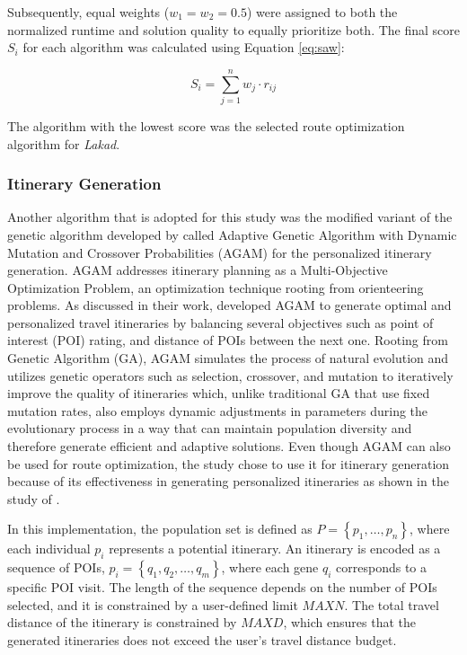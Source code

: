 Subsequently, equal weights ($w _{1} = w _{2} = 0.5$) were assigned to both the normalized runtime and solution quality to equally prioritize both. The final score \( S_{i} \) for each algorithm was calculated using Equation \ref{eq:saw}:

\begin{equation}
	\label{eq:saw}
	S _{i} = \sum_{j=1}^{n} w_j \cdot r _{ij}
\end{equation}

The algorithm with the lowest score was the selected route optimization algorithm for \textit{Lakad}.

\subsubsection{Itinerary Generation}

Another algorithm that is adopted for this study was the modified variant of the genetic algorithm developed by \textcite{Yochum2020} called Adaptive Genetic Algorithm with Dynamic Mutation and Crossover Probabilities (AGAM) for the personalized itinerary generation. AGAM addresses itinerary planning as a Multi-Objective Optimization Problem, an optimization technique rooting from orienteering problems. As discussed in their work, \textcite{Yochum2020} developed AGAM to generate optimal and personalized travel itineraries by balancing several objectives such as point of interest (POI) rating, and distance of POIs between the next one. Rooting from Genetic Algorithm (GA), AGAM simulates the process of natural evolution and utilizes genetic operators such as selection, crossover, and mutation to iteratively improve the quality of itineraries which, unlike traditional GA that use fixed mutation rates, also employs dynamic adjustments in parameters during the evolutionary process in a way that can maintain population diversity and therefore generate efficient and adaptive solutions. Even though AGAM can also be used for route optimization, the study chose to use it for itinerary generation because of its effectiveness in generating personalized itineraries as shown in the study of \textcite{Yochum2020}.

In this implementation, the population set is defined as $P = \left\{ p _{1},\dots, p _{n} \right\}$, where each individual $p _{i}$ represents a potential itinerary. An itinerary is encoded as a sequence of POIs, $p _{i}= \left\{ q _{1}, q _{2}, \dots, q _{m} \right\}$, where each gene $q _{i}$ corresponds to a specific POI visit. The length of the sequence depends on the number of POIs selected, and it is constrained by a user-defined limit $MAXN$. The total travel distance of the itinerary is constrained by $MAXD$, which ensures that the generated itineraries does not exceed the user’s travel distance budget. 

